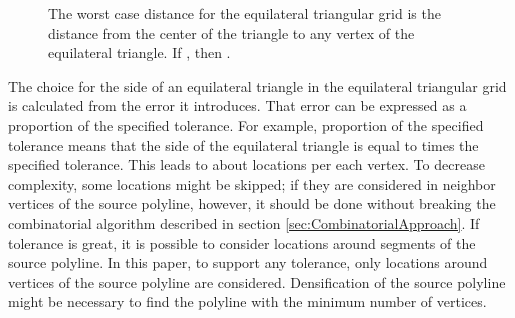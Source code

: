 \documentclass[conference]{IEEEtran}
\begin{document}
\begin{figure} [htb]
  \centering
  \caption
  {
    The worst case distance for the equilateral triangular grid is the distance from the center of the triangle  to any vertex of the equilateral triangle. If , then .
  }
  \label{fig:TriangularGrid}
\end{figure}

The choice for the side of an equilateral triangle in the equilateral triangular grid is calculated from the error it introduces. That error can be expressed as a proportion of the specified tolerance. For example,  proportion of the specified tolerance means that the side of the equilateral triangle is equal to  times the specified tolerance. This leads to about  locations per each vertex. To decrease complexity, some locations might be skipped; if they are considered in neighbor vertices of the source polyline, however, it should be done without breaking the combinatorial algorithm described in section \ref{sec:CombinatorialApproach}. If tolerance is great, it is possible to consider locations around segments of the source polyline. In this paper, to support any tolerance, only locations around vertices of the source polyline are considered. Densification of the source polyline might be necessary to find the polyline with the minimum number of vertices.
\end{document}
